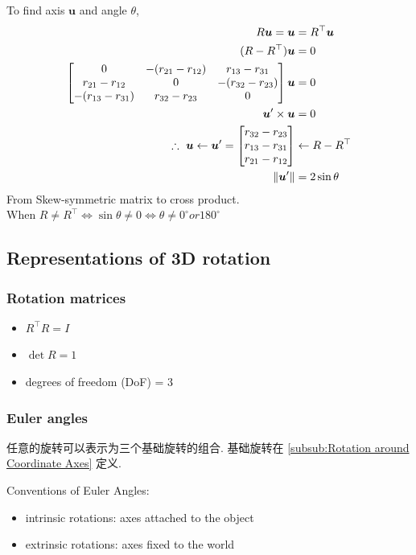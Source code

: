 To find axis $\bm u$ and angle $\theta$,
\begin{align*}
    R\bm u = \bm u &= R^\top \bm u \\
    (R-R^\top)\bm u &= 0\\
    \begin{bmatrix}
        0 & -(r_{21}-r_{12}) & r_{13}-r_{31}\\
        r_{21}-r_{12} & 0 & -(r_{32}-r_{23})\\
        -(r_{13}-r_{31}) & r_{32}-r_{23} & 0
    \end{bmatrix}\bm u &=0\\
    \bm u'\times \bm u &=0\\
    \therefore\ \bm u \leftarrow \bm u' =\begin{bmatrix}
        r_{32}-r_{23} \\
        r_{13}-r_{31} \\
        r_{21}-r_{12}
    \end{bmatrix} &\leftarrow R-R^\top\\
    \left\lVert\bm u'\right\rVert&=2\sin\theta
\end{align*}
From Skew-symmetric matrix to cross product. \\
When $R\ne R^\top \iff \sin\theta \ne 0 \iff \theta\ne 0^{\circ} or 180^{\circ}$


\subsection{Representations of 3D rotation}
\subsubsection{Rotation matrices}
\begin{itemize}
    \item $R^\top R = I$
    \item $\det R=1$
    \item degrees of freedom (DoF) = 3
\end{itemize}


\subsubsection{Euler angles}
任意的旋转可以表示为三个基础旋转的组合. 基础旋转在 \ref{subsub:Rotation around Coordinate Axes} 定义.

Conventions of Euler Angles:
\begin{itemize}
    \item intrinsic rotations: axes attached to the object
    \item extrinsic rotations: axes fixed to the world
\end{itemize}

